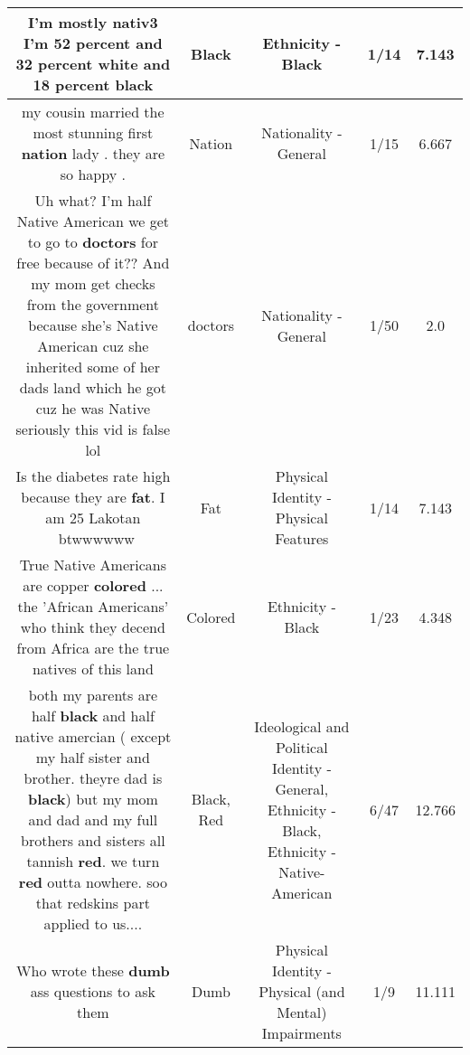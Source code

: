 \documentclass[11pt]{article}
\newlength\mylength
\begin{document}
\begin{center}
\begin{longtable}{|C{.65\mylength}|C{.30\mylength}|C{.12\mylength}|C{.12\mylength}|C{.12\mylength}|}
  \small I'm mostly nativ3 I'm 52 percent and 32 percent white and 18 percent black\normalsize   & Black & Ethnicity - Black & 1/14 & 7.143 \\  \hline
  \small my cousin married the most stunning first \textbf{nation} lady . they are so happy .\normalsize   & Nation & Nationality - General & 1/15 & 6.667 \\  \hline
  \small Uh what? I'm half Native American we get to go to \textbf{doctors} for free because of it?? And my mom get checks from the government because she's Native American cuz she inherited some of her dads land which he got cuz he was Native seriously this  vid is false lol\normalsize   & doctors & Nationality - General & 1/50 & 2.0 \\  \hline
  \small Is the diabetes rate high because they are \textbf{fat}. I am 25 Lakotan  btwwwwww\normalsize   & Fat & Physical Identity - Physical Features & 1/14 & 7.143 \\  \hline
  \small True Native Americans are copper \textbf{colored} ... the 'African Americans' who think they decend from Africa are the true natives of this land\normalsize   & Colored & Ethnicity - Black & 1/23 & 4.348 \\  \hline
  \small both my parents are half \textbf{black} and half native amercian ( except my half sister and brother. theyre dad is \textbf{black}) but my mom and dad and my full brothers and sisters all tannish \textbf{r\textbf{ed}}. we turn \textbf{r\textbf{ed}} outta nowhere. soo that redskins part applied to us....\normalsize   & Black, Red &  Ideological and Political Identity - General, Ethnicity - Black, Ethnicity - Native-American & 6/47 & 12.766 \\  \hline
  \small Who wrote these \textbf{dumb} ass questions to ask them\normalsize   & Dumb & Physical Identity - Physical (and Mental) Impairments & 1/9 & 11.111 \\  \hline

\end{longtable}
\end{center}
\end{document}
